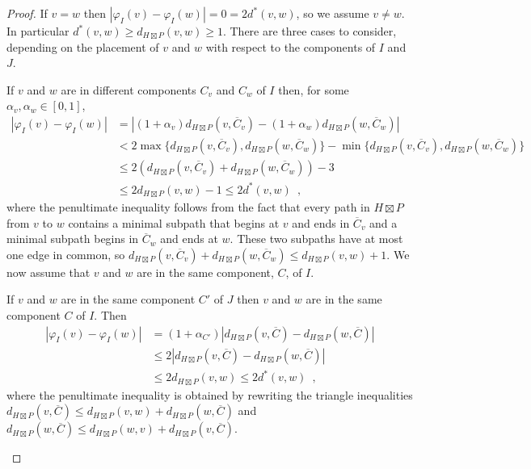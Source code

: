 \documentclass{patmorin}
\renewcommand{\ge}{\geqslant}
\renewcommand{\le}{\leqslant}
\newcommand{\pat}[1]{\textcolor{Blue}{Pat: #1}}
\newcommand{\gwen}[1]{\textcolor{Purple}{Gwen: #1}}
\begin{document}
\begin{proof}
  If $v=w$ then $|\varphi_I(v)-\varphi_I(w)|=0 = 2 d^*(v,w)$, so we assume $v\neq w$. In particular $d^*(v,w)\ge d_{H\boxtimes P}(v,w)\ge 1$.  There are three cases to consider, depending on the placement of $v$ and $w$ with respect to the components of $I$ and $J$.

  \begin{compactenum}
    \item  If $v$ and $w$ are in different components $C_v$ and $C_w$ of $I$ then, for some $\alpha_v,\alpha_w\in[0,1]$,
    \begin{align*}
       |\varphi_I(v)-\varphi_I(w)|
      & =|(1+\alpha_v)d_{H\boxtimes P}(v,\overline{C}_v)-(1+\alpha_w)d_{H\boxtimes P}(w,\overline{C}_w)| \\
      & < 2\max\{d_{H\boxtimes P}(v,\overline{C}_v), d_{H\boxtimes P}(w,\overline{C}_w)\}
      - \min\{d_{H\boxtimes P}(v,\overline{C}_v), d_{H\boxtimes P}(w,\overline{C}_w)\} \\
      & \le 2\left(d_{H\boxtimes P}(v,\overline{C}_v) + d_{H\boxtimes P}(w,\overline{C}_w)\right) - 3\\
      & \le 2d_{H\boxtimes P}(v,w) - 1 \le 2d^*(v,w) \enspace ,
    \end{align*}
    where the penultimate inequality follows from the fact that every path in $H\boxtimes P$ from $v$ to $w$ contains a minimal subpath that begins at $v$ and ends in $\overline{C}_v$ and a minimal subpath begins in $\overline{C}_w$ and ends at $w$.  These two subpaths have at most one edge in common, so
    $d_{H\boxtimes P}(v,\overline{C}_v) + d_{H\boxtimes P}(w,\overline{C}_w) \le d_{H\boxtimes P}(v,w)+1$.  We now  assume that $v$ and $w$ are in the same component, $C$, of $I$.

    \item If $v$ and $w$ are in the same component $C'$ of $J$ then $v$ and $w$ are in the same component $C$ of $I$.  Then
    \begin{align*}
      |\varphi_I(v)-\varphi_I(w)|
      & =(1+\alpha_{C'})|d_{H\boxtimes P}(v,\overline{C})-d_{H\boxtimes P}(w,\overline{C})| \\
      & \le 2|d_{H\boxtimes P}(v,\overline{C})-d_{H\boxtimes P}(w,\overline{C})| \\
      & \le 2 d_{H\boxtimes P}(v,w) \le 2d^*(v,w) \enspace ,
    \end{align*}
    where the penultimate inequality is obtained by rewriting the triangle inequalities $d_{H\boxtimes P}(v,\overline{C})\le d_{H\boxtimes P}(v,w)+d_{H\boxtimes P}(w,\overline{C})$ and $d_{H\boxtimes P}(w,\overline{C})\le d_{H\boxtimes P}(w,v)+d_{H\boxtimes P}(v,\overline{C})$.



\end{compactenum}
\end{proof}
\end{document}
